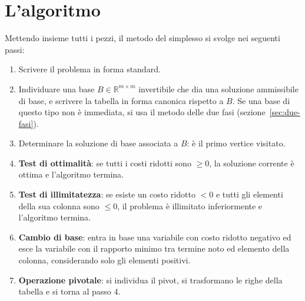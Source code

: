 \section{L'algoritmo}\label{sec:algoritmo}
Mettendo insieme tutti i pezzi, il metodo del simplesso si svolge nei seguenti passi:
\begin{enumerate}
    \item Scrivere il problema in forma standard.
    \item Individuare una base $B \in \mathbb{R}^{m \times m}$ invertibile che dia una soluzione ammissibile di base, e scrivere la tabella in forma canonica rispetto a $B$. Se una base di questo tipo non è immediata, si usa il metodo delle due fasi (sezione~\ref{sec:due-fasi}).
    \item Determinare la soluzione di base associata a $B$: è il primo vertice visitato.
    \item \textbf{Test di ottimalità}: se tutti i costi ridotti sono $\ge 0$, la soluzione corrente è ottima e l'algoritmo termina.
    \item \textbf{Test di illimitatezza}: se esiste un costo ridotto $< 0$ e tutti gli elementi della sua colonna sono $\le 0$, il problema è illimitato inferiormente e l'algoritmo termina.
    \item \textbf{Cambio di base}: entra in base una variabile con costo ridotto negativo ed esce la variabile con il rapporto minimo tra termine noto ed elemento della colonna, considerando solo gli elementi positivi.
    \item \textbf{Operazione pivotale}: si individua il pivot, si trasformano le righe della tabella e si torna al passo 4.
\end{enumerate}

